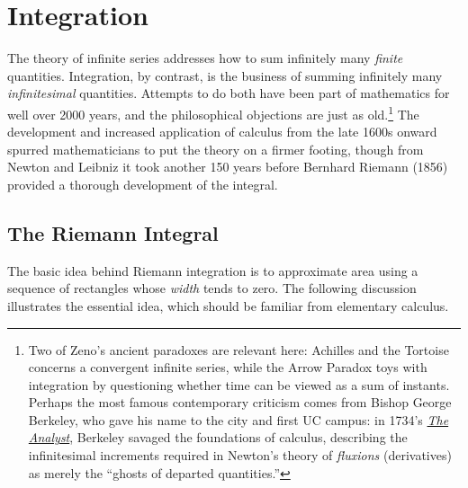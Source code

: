 \graphicspath{{4int/asy/}}

\section{Integration}

The theory of infinite series addresses how to sum infinitely many \emph{finite} quantities. Integration, by contrast, is the business of summing infinitely many \emph{infinitesimal} quantities. Attempts to do both have been part of mathematics for well over 2000 years, and the philosophical objections are just as old.\footnote{%
	Two of Zeno's ancient paradoxes are relevant here: Achilles and the Tortoise concerns a convergent infinite series, while the Arrow Paradox toys with integration by questioning whether time can be viewed as a sum of instants. Perhaps the most famous contemporary criticism comes from Bishop George Berkeley, who gave his name to the city and first UC campus: in 1734's \href{https://en.wikipedia.org/wiki/The_Analyst}{\emph{The Analyst}}, Berkeley savaged the foundations of calculus, describing the infinitesimal increments required in Newton's theory of \emph{fluxions} (derivatives) as merely the ``ghosts of departed quantities.''%
} The development and increased application of calculus from the late 1600s onward spurred mathematicians to put the theory on a firmer footing, though from Newton and Leibniz it took another 150 years before Bernhard Riemann (1856) provided a thorough development of the integral.



\setcounter{subsection}{31}
\subsection{The Riemann Integral}\label{sec:riemann}

The basic idea behind Riemann integration is to approximate area using a sequence of rectangles whose \emph{width} tends to zero. The following discussion illustrates the essential idea, which should be familiar from elementary calculus.

